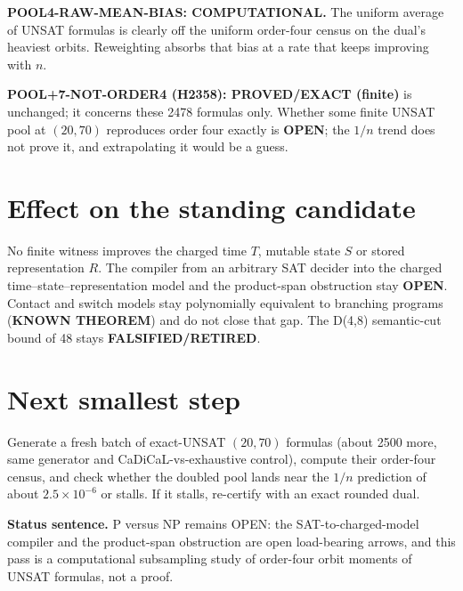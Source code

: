 \documentclass[11pt]{article}
\begin{document}
\textbf{POOL4-RAW-MEAN-BIAS: COMPUTATIONAL.} The uniform average of UNSAT formulas is clearly off the uniform order-four census on the dual's heaviest orbits. Reweighting absorbs that bias at a rate that keeps improving with $n$.

\textbf{POOL+7-NOT-ORDER4 (H2358): PROVED/EXACT (finite)} is unchanged; it concerns these 2478 formulas only. Whether some finite UNSAT pool at $(20,70)$ reproduces order four exactly is \textbf{OPEN}; the $1/n$ trend does not prove it, and extrapolating it would be a guess.

\section*{Effect on the standing candidate}
No finite witness improves the charged time $T$, mutable state $S$ or stored representation $R$. The compiler from an arbitrary SAT decider into the charged time--state--representation model and the product-span obstruction stay \textbf{OPEN}. Contact and switch models stay polynomially equivalent to branching programs (\textbf{KNOWN THEOREM}) and do not close that gap. The D(4,8) semantic-cut bound of 48 stays \textbf{FALSIFIED/RETIRED}.

\section*{Next smallest step}
Generate a fresh batch of exact-UNSAT $(20,70)$ formulas (about 2500 more, same generator and CaDiCaL-vs-exhaustive control), compute their order-four census, and check whether the doubled pool lands near the $1/n$ prediction of about $2.5\times10^{-6}$ or stalls. If it stalls, re-certify with an exact rounded dual.

\bigskip
\noindent\textbf{Status sentence.} P versus NP remains OPEN: the SAT-to-charged-model compiler and the product-span obstruction are open load-bearing arrows, and this pass is a computational subsampling study of order-four orbit moments of UNSAT formulas, not a proof.
\end{document}
